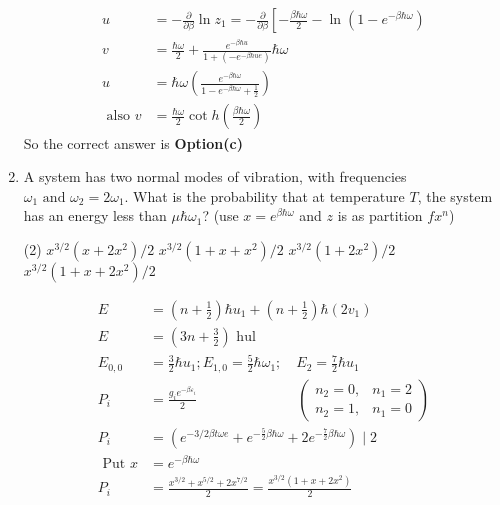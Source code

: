 \begin{enumerate}
\begin{answer}
\begin{align*}
	u&=-\frac{\partial}{\partial \beta} \ln z_{1}=-\frac{\partial}{\partial \beta}\left[-\frac{\beta \hbar \omega}{2}-\ln \left(1-e^{-\beta \hbar \omega}\right)\right.\\
	v&=\frac{\hbar \omega}{2}+\frac{e^{-\beta \hbar u}}{1+\left(-e^{-\beta \hbar u e}\right)} \hbar \omega\\
	u&=\hbar \omega\left(\frac{e^{-\beta \hbar \omega}}{1-e^{-\beta \hbar \omega}+\frac{1}{2}}\right)\\
	\text { also } v&=\frac{\hbar \omega}{2} \cot h\left(\frac{\beta \hbar \omega}{2}\right)
	\end{align*}
	So the correct answer is \textbf{Option(c)}
\end{answer}	
\item A system has two normal modes of vibration, with frequencies $\omega_{1}\text{ and }\omega_{2}=2\omega_{1}$. What is the probability that at temperature $T$, the system has an energy less than $\mu\hbar\omega_{1}$? (use $x=e^{\beta \hbar \omega}$ and $z$ is as partition $fx^n$)
	\begin{tasks}(2)
		\task[\textbf{a.}]$x^{3 / 2}\left(x+2 x^{2}\right) / 2$
		\task[\textbf{b.}]$x^{3 / 2}\left(1+x+x^{2}\right) / 2$
		\task[\textbf{c.}] $x^{3 / 2}\left(1+2 x^{2}\right) / 2$
		\task[\textbf{d.}] $x^{3 / 2}\left(1+x+2 x^{2}\right) / 2$
	\end{tasks}
\begin{answer}
	\begin{align*}
	E&=\left(n+\frac{1}{2}\right) \hbar u_{1}+\left(n+\frac{1}{2}\right) \hbar\left(2 v_{1}\right)\\
	E&=\left(3 n+\frac{3}{2}\right) \text { hul }\\
	E_{0,0}&=\frac{3}{2} \hbar u_{1} ; E_{1,0}=\frac{5}{2} \hbar \omega_{1}; \quad E_{2}=\frac{7}{2} \hbar u_{1}\\
	P_{i}&=\frac{g_{i} e^{-\beta \varepsilon_{i}}}{2}\hspace{3cm}\left(\begin{array}{ll}
	n_{2}=0, & n_{1}=2 \\
	n_{2}=1, & n_{1}=0
	\end{array}\right)\\
	P_{i}&=\left(e^{-3 / 2 \beta t \omega e}+e^{-\frac{5}{2} \beta \hbar \omega}+2 e^{-\frac{7}{2} \beta \hbar \omega}\right) \mid 2\\
	\text { Put } x&=e^{-\beta \hbar \omega}\\
	P_{i}&=\frac{x^{3 / 2}+x^{5 / 2}+2 x^{7 / 2}}{2}=\frac{x^{3 / 2}\left(1+x+2 x^{2}\right)}{2}

\end{align*}
\end{answer}
\end{enumerate}
